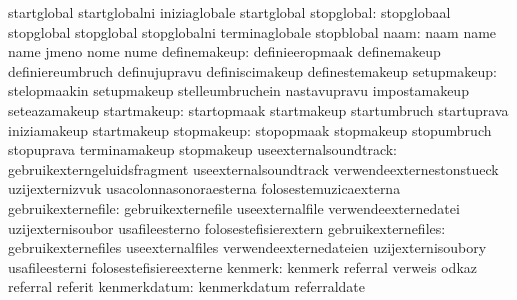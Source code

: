                                   startglobal                      startglobalni
                                  iniziaglobale                    startglobal
                      stopglobal: stopglobaal                      stopglobal
                                  stopglobal                       stopglobalni
                                  terminaglobale                   stopblobal
                            naam: naam                             name
                                  name                             jmeno
                                  nome                             nume
                    definemakeup: definieeropmaak                  definemakeup
                                  definiereumbruch                 definujupravu
                                  definiscimakeup                  definestemakeup %
                     setupmakeup: stelopmaakin                     setupmakeup
                                  stelleumbruchein                 nastavupravu
                                  impostamakeup                    seteazamakeup
                     startmakeup: startopmaak                      startmakeup
                                  startumbruch                     startuprava
                                  iniziamakeup                     startmakeup
                      stopmakeup: stopopmaak                       stopmakeup
                                  stopumbruch                      stopuprava
                                  terminamakeup                    stopmakeup
           useexternalsoundtrack: gebruikexterngeluidsfragment     useexternalsoundtrack
                                  verwendeexternestonstueck        uzijexternizvuk
                                  usacolonnasonoraesterna          folosestemuzicaexterna
              gebruikexternefile: gebruikexternefile               useexternalfile
                                  verwendeexternedatei             uzijexternisoubor
                                  usafileesterno                   folosestefisierextern
             gebruikexternefiles: gebruikexternefiles              useexternalfiles
                                  verwendeexternedateien           uzijexternisoubory
                                  usafileesterni                   folosestefisiereexterne
                         kenmerk: kenmerk                          referral
                                  verweis                          odkaz
                                  referral                         referit %
                    kenmerkdatum: kenmerkdatum                     referraldate
